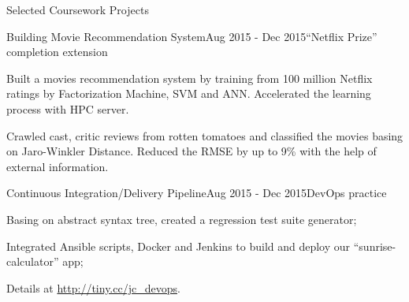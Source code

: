 \documentclass{resume} %
\begin{document}

\begin{rSection}{Selected Coursework Projects}



\begin{rSubsection}{Building Movie Recommendation System}{Aug 2015 - Dec 2015}{``Netflix Prize'' completion extension}{} 
\item Built a movies recommendation system by training from 100 million
Netflix ratings
by Factorization Machine, SVM and ANN. Accelerated the learning process with HPC server.
\item Crawled cast, critic reviews from rotten tomatoes and classified the movies basing on Jaro-Winkler Distance. Reduced the RMSE by up to 9\% with the help of external information.
\end{rSubsection}


\begin{rSubsection}{Continuous Integration/Delivery Pipeline}{Aug 2015 - Dec 2015}{DevOps practice}{} 
\item Basing on abstract syntax tree, created a regression test suite generator;
\item Integrated Ansible scripts, Docker and Jenkins to build and deploy our ``sunrise-calculator'' app;
\item Details at \url{http://tiny.cc/jc_devops}.
\end{rSubsection}

\end{rSection} 
\end{document}
